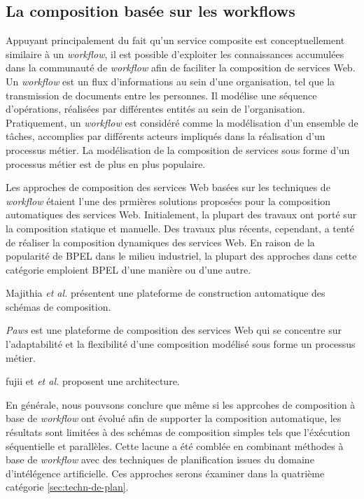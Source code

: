   \subsection{La composition  basée sur les workflows}
    \label{sec:les-approches-basees}
    Appuyant principalement du fait qu'un service composite est
    conceptuellement similaire à un \textit{workflow}, il est possible
    d'exploiter les connaissances accumulées dans la communauté de
    \textit{workflow} afin de faciliter la composition de services
    Web. Un \textit{workflow} est un flux d'informations au sein d'une
    organisation, tel que la transmission de documents entre les
    personnes. Il modélise une séquence d'opérations, réalisées par
    différentes entités au sein de l'organisation. Pratiquement, un
    \textit{workflow} est considéré comme la modélisation d'un
    ensemble de tâches, accomplies par différents acteurs impliqués
    dans la réalisation d'un processus métier. La modélisation de la
    composition de services sous forme d'un processus métier est de
    plus en plus populaire.

    Les approches de composition des services Web basées sur les
    techniques de \textit{workflow} étaient l'une des prmières
    solutions proposées pour la composition automatiques des services
    Web. Initialement, la plupart des travaux ont porté sur la
    composition statique et manuelle. Des travaux plus récents,
    cependant, a tenté de réaliser la composition dynamiques des
    services Web. En raison de la popularité de \textsc{BPEL} dans le
    milieu industriel, la plupart des approches dans cette catégorie
    emploient \textsc{BPEL} d'une manière ou d'une autre.

    Majithia \textit{et al.} \cite{majithia2004framework} présentent
    une plateforme de construction automatique des schémas de
    composition.

    \textit{Paws} \cite{ardagna2007paws} est une plateforme de
    composition des services Web qui se concentre sur l'adaptabilité et
    la flexibilité d'une composition modélisé sous forme un processus
    métier.

    fujii et \textit{et al.} \cite{fujii2006semantics}
    \cite{fujii2009semantics} proposent une architecture.

    En générale, nous pouvsons conclure que même si les apprcohes de
    composition à base de \textit{workflow} ont évolué afin de
    supporter la composition automatique, les résultats sont limitées
    à des schémas de composition simples tels que l'éxécution
    séquentielle et parallèles. Cette lacune a été comblée en
    combinant méthodes à base de \textit{workflow} avec des techniques
    de planification issues du domaine d'intélégence artificielle. Ces
    approches serons éxaminer dans la quatrième catégorie
    \ref{sec:techn-de-plan}.

